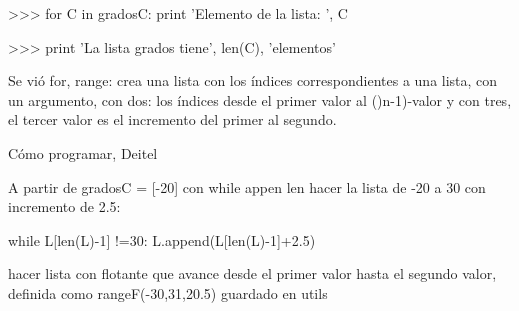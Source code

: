 \documentclass[etterpaper, 12pt, oneside]{article}%
\begin{document}
	>>> for C in gradosC:
			print 'Elemento de la lista: ', C
			
	>>> print 'La lista grados tiene', len(C), 'elementos'
	
	Se vió for, 
	range: crea una lista con los índices correspondientes a una lista, con un argumento,
	con dos: los índices desde el primer valor al ()n-1)-valor y con tres, el tercer valor es el incremento del primer al segundo.
	
	Cómo programar, Deitel
	
	A partir de gradosC = [-20]
	con while appen len hacer la lista de -20 a 30 con incremento de 2.5:
	
	while L[len(L)-1] !=30:
		L.append(L[len(L)-1]+2.5)
		
	hacer lista con flotante que avance desde el primer valor hasta el segundo valor, definida como
	rangeF(-30,31,20.5)
	guardado en utils
	
	
\end{document}
